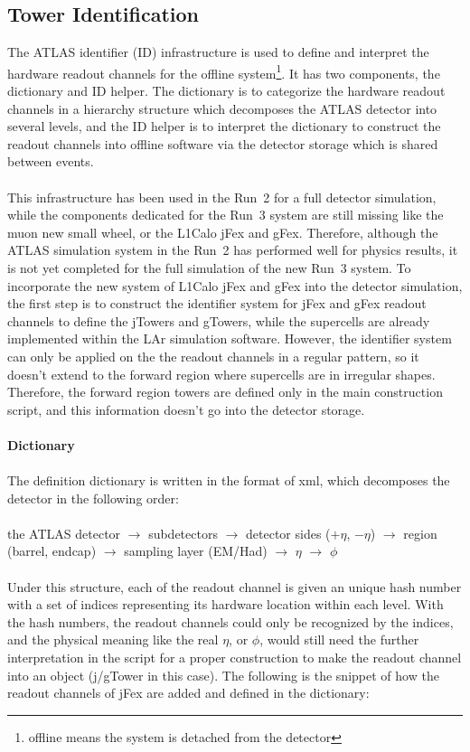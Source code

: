 \subsection{Tower Identification}
The ATLAS identifier (ID) infrastructure\cite{Schaffer:684167,Arnault:2003pa} is used to define and interpret the hardware readout channels for the offline system\footnote{offline means the system is detached from the detector}. It has two components, the dictionary and ID helper. The dictionary is to categorize the hardware readout channels in a hierarchy structure which decomposes the ATLAS detector into several levels, and the ID helper is to interpret the dictionary to construct the readout channels into offline software via the detector storage\cite{Calafiura:2003gf} which is shared between events. 
\\
\\This infrastructure has been used in the Run~2 for a full detector simulation, while the components dedicated for the Run~3 system are still missing like the muon new small wheel, or the L1Calo jFex and gFex. Therefore, although the ATLAS simulation system in the Run~2 has performed well for physics results, it is not yet completed for the full simulation of the new Run~3 system. To incorporate the new system of L1Calo jFex and gFex into the detector simulation, the first step is to construct the identifier system for jFex and gFex readout channels to define the jTowers and gTowers, while the supercells are already implemented within the LAr simulation software. However, the identifier system can only be applied on the the readout channels in a regular pattern, so it doesn't extend to the forward region where supercells are in irregular shapes. Therefore, the forward region towers are defined only in the main construction script, and this information doesn't go into the detector storage\cite{Calafiura:2003gf}. 
\\
\\{\bf Dictionary}
\\
\\The definition dictionary is written in the format of xml, which decomposes the detector in the following order:
\\
\\the ATLAS detector $\to$ subdetectors $\to$ detector sides ($+\eta$, $-\eta$) $\to$ region (barrel, endcap) $\to$ sampling layer (EM/Had) $\to$ $\eta$ $\to$ $\phi$
\\
\\Under this structure, each of the readout channel is given an unique hash number with a set of indices representing its hardware location within each level. With the hash numbers, the readout channels could only be recognized by the indices, and the physical meaning like the real $\eta$, or $\phi$, would still need the further interpretation in the script for a proper construction to make the readout channel into an object (j/gTower in this case). The following is the snippet of how the readout channels of jFex are added and defined in the dictionary:
